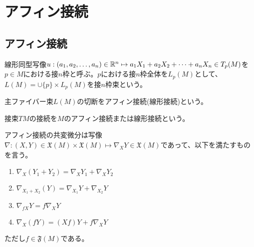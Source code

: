 \section{アフィン接続}

\subsection{アフィン接続}
    \begin{dfn}
        線形同型写像$u: (a_1, a_2, \dots, a_n) \in \mathbb{R}^n \mapsto a_1X_1 + a_2X_2 + \dots + a_nX_n \in T_p(M)$を$p \in M$における接$n$枠と呼ぶ。$p$における接$n$枠全体を$L_p(M)$として、$L(M) = \cup \{p\} \times L_p(M)$を接$n$枠束という。
    \end{dfn}

    \begin{dfn}[アフィン接続]
        主ファイバー束$L(M)$の切断をアフィン接続(線形接続)という。
    \end{dfn}

    \begin{dfn}
        接束$TM$の接続を$M$のアフィン接続または線形接続という。
    \end{dfn}

    \begin{dfn}[共変微分]
        アフィン接続の共変微分は写像$\nabla: (X, Y) \in \mathfrak{X}(M) \times \mathfrak{X}(M) \mapsto \nabla_XY \in \mathfrak{X}(M)$であって、以下を満たすものを言う。
        \begin{enumerate}
            \item $\nabla_X(Y_1 + Y_2) = \nabla_XY_1 + \nabla_XY_2$
            \item $\nabla_{X_1 + X_2}(Y) = \nabla_{X_1}Y + \nabla_{X_2}Y$
            \item $\nabla_{fX}Y = f\nabla_XY$
            \item $\nabla_X(fY) = (Xf)Y + f\nabla_XY$
        \end{enumerate}
        ただし$f \in \mathfrak{F}(M)$である。
    \end{dfn}



